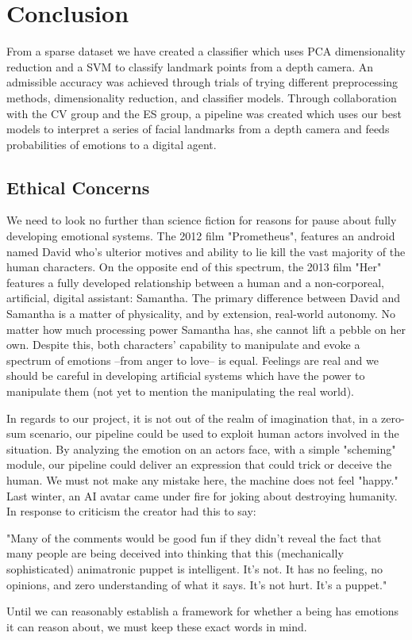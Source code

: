 \section{Conclusion}

From a sparse dataset we have created a classifier which uses PCA dimensionality reduction and a SVM to classify landmark points from a depth camera. An admissible accuracy was achieved through trials of trying different preprocessing methods, dimensionality reduction, and classifier models. Through collaboration with the CV group and the ES group, a pipeline was created which uses our best models to interpret a series of facial landmarks from a depth camera and feeds probabilities of emotions to a digital agent.

\subsection{Ethical Concerns}
We need to look no further than science fiction for reasons for pause about fully developing emotional systems. The 2012 film "Prometheus", features an android named David who's ulterior motives and ability to lie kill the vast majority of the human characters. On the opposite end of this spectrum, the 2013 film "Her" features a fully developed relationship between a human and a non-corporeal, artificial, digital assistant: Samantha. The primary difference between David and Samantha is a matter of physicality, and by extension, real-world autonomy. No matter how much processing power Samantha has, she cannot lift a pebble on her own. Despite this, both characters' capability to manipulate and evoke a spectrum of emotions --from anger to love-- is equal. Feelings are real and we should be careful in developing artificial systems which have the power to manipulate them (not yet to mention the manipulating the real world).

In regards to our project, it is not out of the realm of imagination that, in a zero-sum scenario, our pipeline could be used to exploit human actors involved in the situation. By analyzing the emotion on an actors face, with a simple "scheming" module, our pipeline could deliver an expression that could trick or deceive the human. We must not make any mistake here, the machine does not feel "happy." Last winter, an AI avatar came under fire for joking about destroying humanity. In response to criticism the creator had this to say:

"Many of the comments would be good fun if they didn’t reveal the fact that many people are being deceived into thinking that this (mechanically sophisticated) animatronic puppet is intelligent. It’s not. It has no feeling, no opinions, and zero understanding of what it says. It’s not hurt. It’s a puppet." \cite{sofia}

Until we can reasonably establish a framework for whether a being has emotions it can reason about, we must keep these exact words in mind.